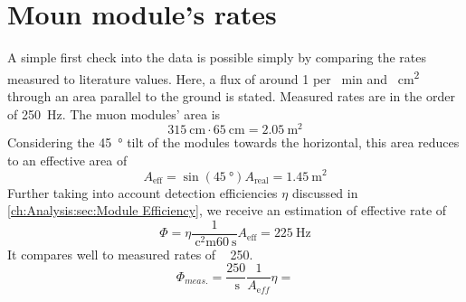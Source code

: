   \section{Moun module's rates}
  \label{ch:Analysis:sec:Muon module's rates}
  A simple first check into the data is possible simply by comparing the rates measured to literature values. Here, a flux of around 1 per \SI{}{\minute} and \SI{}{\square\centi\meter} through an area parallel to the ground is stated. Measured rates are in the order of \SI{250}{\hertz}. The muon modules' area is
  \begin{equation}
  	\SI{315}{\centi\meter} \cdot \SI{65}{\centi\meter} = \SI{2.05}{\square\meter}
  \end{equation}
  Considering the \SI{45}{\degree} tilt of the modules towards the horizontal, this area reduces to an effective area of 
  \begin{equation}
  	A_{\mathrm{eff}} = \sin{\left(\SI{45}{\degree}\right)} A_{\mathrm{real}} = \SI{1.45}{\square\meter}
  \end{equation}
  Further taking into account detection efficiencies $\eta$ discussed in \ref{ch:Analysis:sec:Module Efficiency}, we receive an estimation of effective rate of
  \begin{equation}
  	\Phi = \eta \frac{1}{\SI{}{\square\centi\meter}\SI{60}{\second}}A_{\mathrm{eff}} = \SI{225}{\hertz}
  \end{equation}
  It compares well to measured rates of  ~ 250.
  \begin{equation}
  	\Phi_{meas.} = \frac{250}{\SI{}{\second}} \frac{1}{A_{\mathrm eff}}\eta= 
  \end{equation}

  
